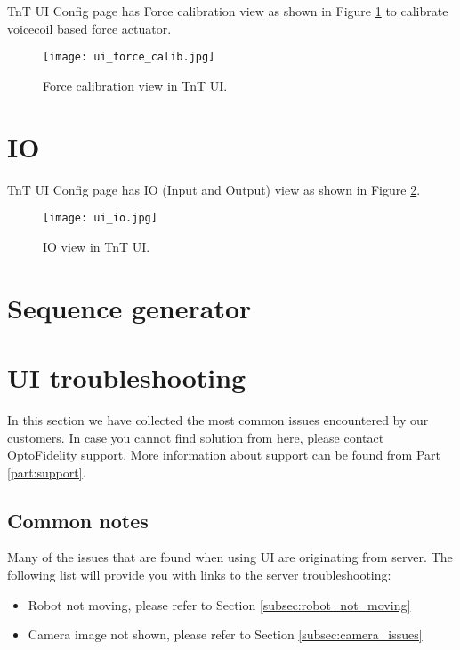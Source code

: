 TnT UI Config page has Force calibration view as shown in Figure \ref{fig:ui_force_calib} to calibrate voicecoil based force actuator.

\begin{figure}[h]
	\centering
	\texttt{[image: ui\_force\_calib.jpg]}
	\caption{Force calibration view in TnT UI.}
	\label{fig:ui_force_calib}
\end{figure}





\section{IO}

TnT UI Config page has IO (Input and Output) view as shown in Figure \ref{fig:ui_io}.

\begin{figure}[h]
	\centering
	\texttt{[image: ui\_io.jpg]}
	\caption{IO view in TnT UI.}
	\label{fig:ui_io}
\end{figure}



\section{Sequence generator}



\section{UI troubleshooting}
In this section we have collected the most common issues encountered by our customers. In case you cannot find solution from here, please contact OptoFidelity support. More information about support can be found from Part \ref{part:support}.

\subsection{Common notes}
Many of the issues that are found when using UI are originating from server. The following list will provide you with links to the server troubleshooting:
\begin{itemize}
	\item Robot not moving, please refer to Section \ref{subsec:robot_not_moving}
	\item Camera image not shown, please refer to Section \ref{subsec:camera_issues}
\end{itemize}

